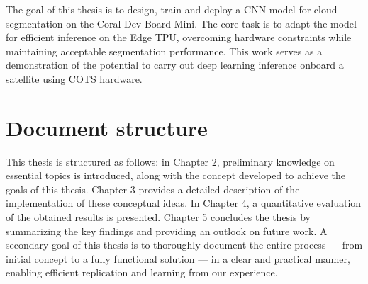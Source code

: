 {The goal of this thesis is to design, train and deploy a CNN model for cloud segmentation on the Coral Dev Board Mini. The core task is to adapt the model for efficient inference on the Edge TPU, overcoming hardware constraints while maintaining acceptable segmentation performance. This work serves as a demonstration of the potential to carry out deep learning inference onboard a satellite using COTS hardware.

\section{Document structure}

This thesis is structured as follows: in Chapter 2, preliminary knowledge on essential topics is introduced, along with the concept developed to achieve the goals of this thesis. Chapter 3 provides a detailed description of the implementation of these conceptual ideas. In Chapter 4, a quantitative evaluation of the obtained results is presented. Chapter 5 concludes the thesis by summarizing the key findings and providing an outlook on future work. A secondary goal of this thesis is to thoroughly document the entire process --- from initial concept to a fully functional solution –-- in a clear and practical manner, enabling efficient replication and learning from our experience.


}